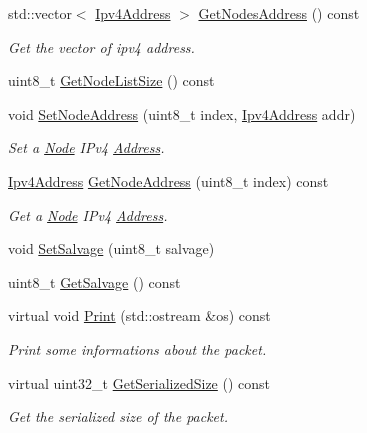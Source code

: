\begin{DoxyCompactItemize}
std\+::vector$<$ \hyperlink{classns3_1_1Ipv4Address}{Ipv4\+Address} $>$ \hyperlink{classns3_1_1dsr_1_1DsrOptionSRHeader_a4b354aa443936dc063b4756ed323af33}{Get\+Nodes\+Address} () const 
\begin{DoxyCompactList}\small\item\em Get the vector of ipv4 address. \end{DoxyCompactList}\item 
uint8\+\_\+t \hyperlink{classns3_1_1dsr_1_1DsrOptionSRHeader_aaf2af70fb8555a2f45c43c7ef43d3062}{Get\+Node\+List\+Size} () const 
\item 
void \hyperlink{classns3_1_1dsr_1_1DsrOptionSRHeader_aa8208507a825039423017c2bb3e9a3d5}{Set\+Node\+Address} (uint8\+\_\+t index, \hyperlink{classns3_1_1Ipv4Address}{Ipv4\+Address} addr)
\begin{DoxyCompactList}\small\item\em Set a \hyperlink{classns3_1_1Node}{Node} I\+Pv4 \hyperlink{classns3_1_1Address}{Address}. \end{DoxyCompactList}\item 
\hyperlink{classns3_1_1Ipv4Address}{Ipv4\+Address} \hyperlink{classns3_1_1dsr_1_1DsrOptionSRHeader_a2427743dfffec593db5b28148ebc68ce}{Get\+Node\+Address} (uint8\+\_\+t index) const 
\begin{DoxyCompactList}\small\item\em Get a \hyperlink{classns3_1_1Node}{Node} I\+Pv4 \hyperlink{classns3_1_1Address}{Address}. \end{DoxyCompactList}\item 
void \hyperlink{classns3_1_1dsr_1_1DsrOptionSRHeader_a70a69c4774bf6dc7d5e840a2e5e67b71}{Set\+Salvage} (uint8\+\_\+t salvage)
\item 
uint8\+\_\+t \hyperlink{classns3_1_1dsr_1_1DsrOptionSRHeader_a4d0ddd2d9930343280e1244e76a40935}{Get\+Salvage} () const 
\item 
virtual void \hyperlink{classns3_1_1dsr_1_1DsrOptionSRHeader_a7ce7e136424e6887249e66a0f8de7130}{Print} (std\+::ostream \&os) const 
\begin{DoxyCompactList}\small\item\em Print some informations about the packet. \end{DoxyCompactList}\item 
virtual uint32\+\_\+t \hyperlink{classns3_1_1dsr_1_1DsrOptionSRHeader_a99d921d074f203984b6c21f1553041d7}{Get\+Serialized\+Size} () const 
\begin{DoxyCompactList}\small\item\em Get the serialized size of the packet. \end{DoxyCompactList}\item 

\end{DoxyCompactItemize}
